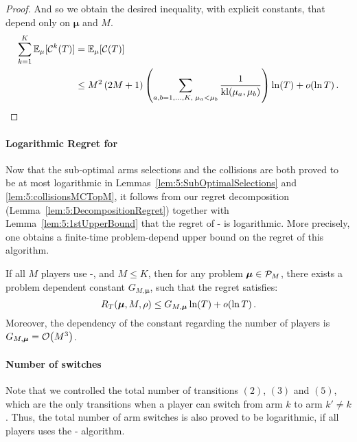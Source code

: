 \begin{proof}
  And so we obtain the desired inequality, with explicit constants, that depend only on $\boldsymbol{\mu}$ and $M$.
  \begin{align}
    \sum_{k=1}^K \mathbb{E}_{\mu}[\mathcal{C}^k(T)] & = \mathbb{E}_{\mu}[\mathcal{C}(T)] \nonumber\\
    & \leq M^2\left(2 M + 1\right) \left(\sum_{a,b=1,\dots,K,\;\mu_a < \mu_b} \frac{1}{\mathrm{kl}(\mu_a,\mu_b)}\right) \ln(T) + \mathop{}\mathopen{}o\mathopen{}\left(\ln T\right).
  \end{align}
\end{proof}



\paragraph{Logarithmic Regret for \MCTopM}
%
Now that the sub-optimal arms selections and the collisions
are both proved to be at most logarithmic in Lemmas~\ref{lem:5:SubOptimalSelections} and \ref{lem:5:collisionsMCTopM},
it follows from our regret decomposition (Lemma~\ref{lem:5:DecompositionRegret}) together with Lemma~\ref{lem:5:1stUpperBound} that the regret of \MCTopM-\klUCB{} is logarithmic. More precisely, one obtains a finite-time problem-depend upper bound on the regret of this algorithm.

\begin{theorem}\label{thm:5:LogarithmicRegret_MCTopMklUCB}
  If all $M$ players use
  \MCTopM-\klUCB, and $M \leq K$,
  then for any problem $\boldsymbol{\mu} \in \mathcal{P}_M$,
  there exists a problem dependent constant $G_{M,\boldsymbol{\mu}}$, such that
  the regret satisfies:
  \begin{equation}\label{eq:5:LogarithmicRegret_MCTopMklUCB}
    R_T(\boldsymbol{\mu}, M, \rho) \leq G_{M,\boldsymbol{\mu}} \ln(T) + \mathop{}\mathopen{}o\mathopen{}\left(\ln T\right).
  \end{equation}
  Moreover, the dependency of the constant regarding the number of players is $G_{M,\boldsymbol{\mu}} = \mathop{}\mathopen{}\mathcal{O}\mathopen{}\left(M^3\right)$.
\end{theorem}


\paragraph{Number of switches}\label{app:5:NumberSwitches}
%
Note that we controlled the total number of transitions $(2)$, $(3)$ and $(5)$,
which are the only transitions when a player can switch from arm $k$ to arm $k'\neq k$.
Thus, the total number of arm switches is also proved to be logarithmic, if all players uses
the \MCTopM-\klUCB{} algorithm.


